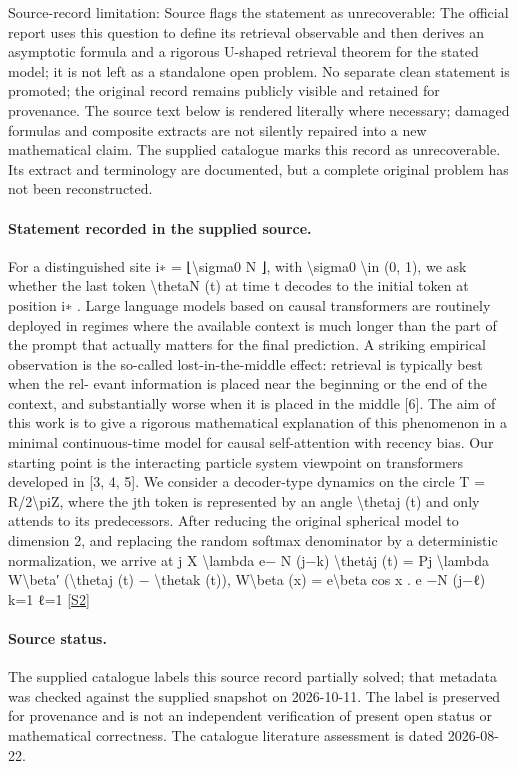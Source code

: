 \documentclass[11pt]{article}
\begin{document}
Source-record limitation: Source flags the statement as unrecoverable: The official report uses this question to define its retrieval observable and then derives an asymptotic formula and a rigorous U-shaped retrieval theorem for the stated model; it is not left as a standalone open problem. No separate clean statement is promoted; the original record remains publicly visible and retained for provenance.
The source text below is rendered literally where necessary; damaged formulas and composite extracts are not silently repaired into a new mathematical claim.
The supplied catalogue marks this record as unrecoverable. Its extract and terminology are documented, but a complete original problem has not been reconstructed.
\paragraph{Statement recorded in the supplied source.}
For a distinguished site i∗ = ⌊\textbackslash{}sigma0 N ⌋, with \textbackslash{}sigma0 \textbackslash{}in (0, 1), we ask whether the last token \textbackslash{}thetaN (t) at time t decodes to the initial token at position i∗ . Large language models based on causal transformers are routinely deployed in regimes where the available context is much longer than the part of the prompt that actually matters for the ﬁnal prediction. A striking empirical observation is the so-called lost-in-the-middle eﬀect: retrieval is typically best when the rel- evant information is placed near the beginning or the end of the context, and substantially worse when it is placed in the middle [6]. The aim of this work is to give a rigorous mathematical explanation of this phenomenon in a minimal continuous-time model for causal self-attention with recency bias. Our starting point is the interacting particle system viewpoint on transformers developed in [3, 4, 5]. We consider a decoder-type dynamics on the circle T = R/2\textbackslash{}piZ, where the jth token is represented by an angle \textbackslash{}thetaj (t) and only attends to its predecessors. After reducing the original spherical model to dimension 2, and replacing the random softmax denominator by a deterministic normalization, we arrive at j X \textbackslash{}lambda e− N (j−k) \textbackslash{}thetȧj (t) = Pj \textbackslash{}lambda W\textbackslash{}beta′ (\textbackslash{}thetaj (t) − \textbackslash{}thetak (t)), W\textbackslash{}beta (x) = e\textbackslash{}beta cos x . e −N (j−ℓ) k=1 ℓ=1 \href{https://doi.org/10.4171/owr/2026/13}{[S2]}
\paragraph{Source status.}
The supplied catalogue labels this source record partially solved; that metadata was checked against the supplied snapshot on 2026-10-11. The label is preserved for provenance and is not an independent verification of present open status or mathematical correctness. The catalogue literature assessment is dated 2026-08-22.
\end{document}
